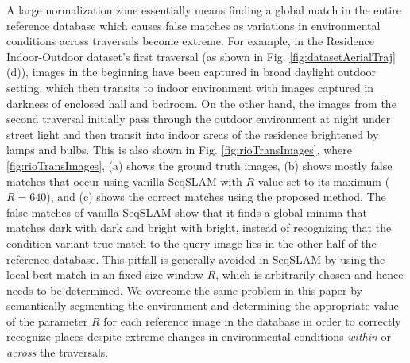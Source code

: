 \documentclass[letterpaper, 10 pt, conference]{ieeeconf}  %
\begin{document}
A large normalization zone essentially means finding a global match in the entire reference database which causes false matches as variations in environmental conditions across traversals become extreme. For example, in the Residence Indoor-Outdoor dataset's first traversal (as shown in Fig. \ref{fig:datasetAerialTraj}(d)), images in the beginning have been captured in broad daylight outdoor setting, which then transits to indoor environment with images captured in darkness of enclosed hall and bedroom. On the other hand, the images from the second traversal initially pass through the outdoor environment at night under street light and then transit into indoor areas of the residence brightened by lamps and bulbs. This is also shown in Fig. \ref{fig:rioTransImages}, where \ref{fig:rioTransImages}, (a) shows the ground truth images, (b) shows mostly false matches that occur using vanilla SeqSLAM with $R$ value set to its maximum ($R=640$), and (c) shows the correct matches using the proposed method. The false matches of vanilla SeqSLAM show that it finds a global minima that matches dark with dark and bright with bright, instead of recognizing that the condition-variant true match to the query image lies in the other half of the reference database. This pitfall is generally avoided in SeqSLAM by using the local best match in an fixed-size window $R$, which is arbitrarily chosen and hence needs to be determined. We overcome the same problem in this paper by semantically segmenting the environment and determining the appropriate value of the parameter $R$ for each reference image in the database in order to correctly recognize places despite extreme changes in environmental conditions \emph{within} or \emph{across} the traversals.

\newcommand{\imgW}{2.0cm}
\newcommand{\imgH}{0.8cm}
\end{document}
